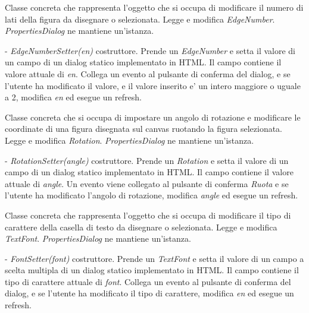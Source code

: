 Classe concreta che rappresenta l'oggetto che si occupa di modificare il numero di lati della figura da disegnare o selezionata.
Legge e modifica \textit{EdgeNumber}.
\textit{PropertiesDialog} ne mantiene un'istanza.
\begin{elencopuntato}[\subsubsecindent]
\item[-] \textit{EdgeNumberSetter(en)} costruttore. Prende un \textit{EdgeNumber} e setta il valore di un campo di un dialog statico implementato in HTML. Il campo contiene il valore attuale di \textit{en}. Collega un evento al pulsante di conferma del dialog, e se l'utente ha modificato il valore, e il valore inserito e' un intero maggiore o uguale a 2, modifica \textit{en} ed esegue un refresh.
\end{elencopuntato}

Classe concreta che si occupa di impostare un angolo di rotazione e modificare le coordinate di una figura disegnata sul canvas ruotando la figura selezionata.
Legge e modifica \textit{Rotation}.
\textit{PropertiesDialog} ne mantiene un'istanza.
\begin{elencopuntato}[\subsubsecindent]
\item[-] \textit{RotationSetter(angle)} costruttore. Prende un \textit{Rotation} e setta il valore di un campo di un dialog statico implementato in HTML. Il campo contiene il valore attuale di \textit{angle}. Un evento viene collegato al pulsante di conferma \textit{Ruota} e se l'utente ha modificato l'angolo di rotazione, modifica \textit{angle} ed esegue un refresh. 
\end{elencopuntato}

Classe concreta che rappresenta l'oggetto che si occupa di modificare il tipo di carattere della casella di testo da disegnare o selezionata.
Legge e modifica \textit{TextFont}.
\textit{PropertiesDialog} ne mantiene un'istanza.
\begin{elencopuntato}[\subsubsecindent]
\item[-] \textit{FontSetter(font)} costruttore. Prende un \textit{TextFont} e setta il valore di un campo a scelta multipla di un dialog statico implementato in HTML. Il campo contiene il tipo di carattere attuale di \textit{font}. Collega un evento al pulsante di conferma del dialog, e se l'utente ha modificato il tipo di carattere, modifica \textit{en} ed esegue un refresh.
\end{elencopuntato}

